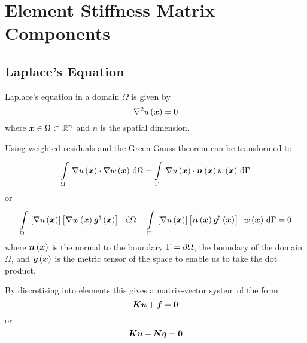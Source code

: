 \chapter{Element Stiffness Matrix Components}
\label{app:ElementStiffnessMatrixComponents}

\section{Laplace's Equation}
\label{sec:ElementStiffnessMatrixLaplace}

Laplace's equation in a domain $\Omega$ is given by  \ie
\begin{equation}
  \laplacian{}{\fnof{u}{\vectr{x}}}=0
\end{equation}
where $\vectr{x}\in\Omega\subset\rntopology{n}$ and $n$ is the spatial dimension.

Using weighted residuals and the Green-Gauss theorem
 can be transformed to
 \ie
\begin{equation}
  \gint{\Omega}{}{\dotprod{\gradient{}{\fnof{u}{\vectr{x}}}}{\gradient{}{\fnof{w}{\vectr{x}}}}}{\Omega}=
  \gint{\Gamma}{}{\dotprod{\gradient{}{\fnof{u}{\vectr{x}}}}{\fnof{\normal}{\vectr{x}}}\fnof{w}{\vectr{x}}}{\Gamma}
\end{equation}
or
\begin{equation}
  \gint{\Omega}{}{\sqbrac{\gradient{}{\fnof{u}{\vectr{x}}}}
    \transpose{\sqbrac{\gradient{}{\fnof{w}{\vectr{x}}}\fnof{\sharptensor{\generalmetrictensor}}{\vectr{x}}}}}{\Omega}-
  \gint{\Gamma}{}{\sqbrac{\gradient{}{\fnof{u}{\vectr{x}}}}
    \transpose{\sqbrac{\fnof{\normal}{\vectr{x}}\fnof{\sharptensor{\generalmetrictensor}}{\vectr{x}}}}\fnof{w}{\vectr{x}}}{\Gamma}=0
  \label{eqn:ElementMatricesLaplaceStartingEqution}
\end{equation}
where $  \boldsymbol{n} \left(  \boldsymbol{x}  \right) $ is the normal to the boundary $\Gamma= \partial{\Omega} $, the boundary of the domain
$\Omega$, and $  \boldsymbol{\mathit{ g }} \left(  \boldsymbol{x}  \right) $ is the metric tensor of the space to enable us
to take the dot product.

By discretising into elements this gives a matrix-vector system of the form
\begin{equation}
  \matr{K}\vect{u}+\vect{f}=\vect{0}
\end{equation}
or
\begin{equation}
  \matr{K}\vect{u}+\matr{N}\vectr{q}=\vect{0}
\end{equation}

